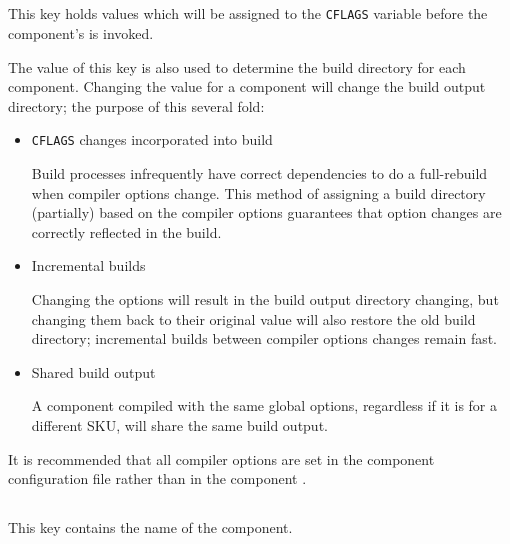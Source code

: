 \subsection{}\label{variables:cflags}

This key holds values which will be assigned to the \texttt{CFLAGS}
variable before the component's \makefile is invoked.

The value of this key is also used to determine the build directory
for each component.  Changing the value for a component will change
the build output directory; the purpose of this several fold:

\begin{itemize}
\item \texttt{CFLAGS} changes incorporated into build

  Build processes infrequently have correct dependencies to do a
  full-rebuild when compiler options change.  This method of assigning
  a build directory (partially) based on the compiler options
  guarantees that option changes are correctly reflected in the build.

\item Incremental builds

  Changing the options will result in the build output directory
  changing, but changing them back to their original value will also
  restore the old build directory; incremental builds between compiler
  options changes remain fast.

\item Shared build output

  A component compiled with the same global options, regardless if it
  is for a different SKU, will share the same build output.

\end{itemize}

It is recommended that all compiler options are set in the component
configuration file rather than in the component \makefile.


\subsection{}\label{variables:component}

This key contains the name of the component.


